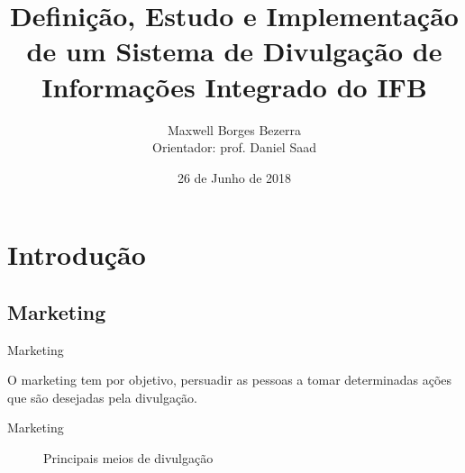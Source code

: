 \documentclass{aula-ifb}
\author{Maxwell Borges Bezerra\\ 
\small{Orientador: prof. Daniel Saad}}
\title{Definição, Estudo e Implementação de um Sistema de Divulgação de Informações Integrado do IFB}
\institute{Instituto Federal de Brasília, Câmpus Taguatinga}
\date{26 de Junho de 2018}
\begin{document}
\maketitle
\section{Introdução}
\subsection{Marketing}
\begin{frame}{Marketing}
\begin{center}
O marketing tem por objetivo, persuadir as pessoas a tomar determinadas ações que são desejadas pela divulgação.
\end{center}
\end{frame}

\begin{frame}{Marketing}
\begin{figure}[h]
  \centering
  \caption{Principais meios de divulgação}
  \quad %
  \quad %
  \quad %
\label{fig1}
\end{figure}
\end{frame}
\end{document}
